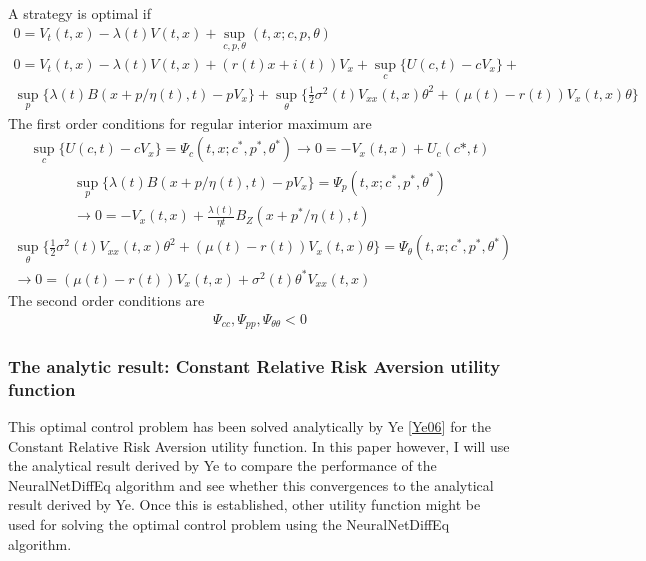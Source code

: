 \documentclass[letterpaper,10pt,english]{jupyterBook}
\begin{document}
\sphinxAtStartPar
A strategy is optimal if
\begin{gather*}
0 =V_t(t,x) -\lambda(t)V(t,x) + \sup_{c,p,\theta}(t,x;c,p,\theta)  \\
0 = V_t(t,x) -\lambda(t)V(t,x) + (r(t)x+ i(t))V_x + \sup_c\{U(c,t)-cV_x\} + \\ \sup_p\{\lambda(t)B(x + p/\eta(t),t) - pV_x\} + \sup_\theta \{ \frac{1}{2}\sigma^2(t)V_{xx}(t,x)\theta^2 +(\mu(t) - r(t))V_x(t,x)\theta\} 
\end{gather*}
\sphinxAtStartPar
The first order conditions for regular interior maximum are
\begin{equation*}
\begin{split}\sup_c  \{ U(c,t) - cV_x\} = \Psi_c(t,x;c^*,p^*,\theta^*)  \rightarrow  0 = -V_x(t,x) + U_c(c*,t) \end{split}
\end{equation*}\begin{equation*}
\begin{split} \sup_p\{\lambda(t)B(x + p/\eta(t),t) - pV_x\} = \Psi_p(t,x;c^*,p^*,\theta^*) \\ \rightarrow 0 = -V_x(t,x) + \frac{\lambda(t)}{\eta{t}}B_Z(x + p^*/\eta(t),t) \end{split}
\end{equation*}\begin{equation*}
\begin{split} \sup_\theta \{ \frac{1}{2}\sigma^2(t)V_{xx}(t,x)\theta^2 +(\mu(t) - r(t))V_x(t,x)\theta\} = \Psi_\theta(t,x;c^*,p^*,\theta^*)\\ \rightarrow 0 = (\mu(t) -r(t))V_x(t,x) + \sigma^2(t)\theta^*V_{xx}(t,x) \end{split}
\end{equation*}
\sphinxAtStartPar
The second order conditions are
\begin{equation*}
\begin{split} \Psi_{cc}, \Psi_{pp}, \Psi_{\theta \theta} < 0 \end{split}
\end{equation*}

\subsubsection{The analytic result: Constant Relative Risk Aversion utility function}
\label{\detokenize{Financial_application:the-analytic-result-constant-relative-risk-aversion-utility-function}}
\sphinxAtStartPar
This optimal control problem has been solved analytically by Ye {[}\hyperlink{cite.Financial_application:id24}{Ye06}{]} for the Constant Relative Risk Aversion utility function. In this paper however, I will use the analytical result derived by Ye to compare the performance of the NeuralNetDiffEq algorithm and see whether this convergences to the analytical result derived by Ye. Once this is established, other utility function might be used for solving the optimal control problem using the NeuralNetDiffEq algorithm.
\end{document}
